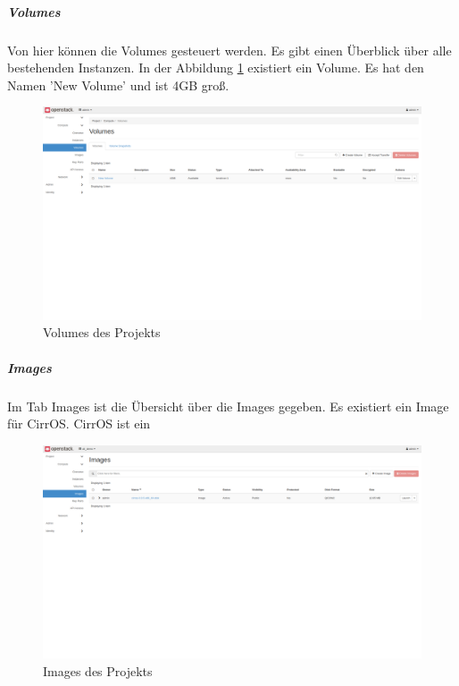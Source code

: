 \documentclass[a4paper,10pt]{article}
\begin{document}
\subparagraph{Volumes}

Von hier können die Volumes gesteuert werden.
Es gibt einen Überblick über alle bestehenden Instanzen.
In der Abbildung \ref{fig:devstack:volumes} existiert ein Volume.
Es hat den Namen 'New Volume' und ist 4GB groß.

\begin{figure}[htbp]
\centering
\caption{Volumes des Projekts}
\label{fig:devstack:volumes}
\includegraphics[width=\textwidth, trim={0 17cm 0 0}, clip]{graphics/devstack/14_AddedVolume}
\end{figure}

\subparagraph{Images}

Im Tab Images ist die Übersicht über die Images gegeben.
Es existiert ein Image für CirrOS.
CirrOS ist ein 

\begin{figure}[htbp]
\centering
\caption{Images des Projekts}
\label{fig:devstack:images}
\includegraphics[width=\textwidth, trim={0 17cm 0 0}, clip]{graphics/devstack/02_Images}
\end{figure}
\end{document}
